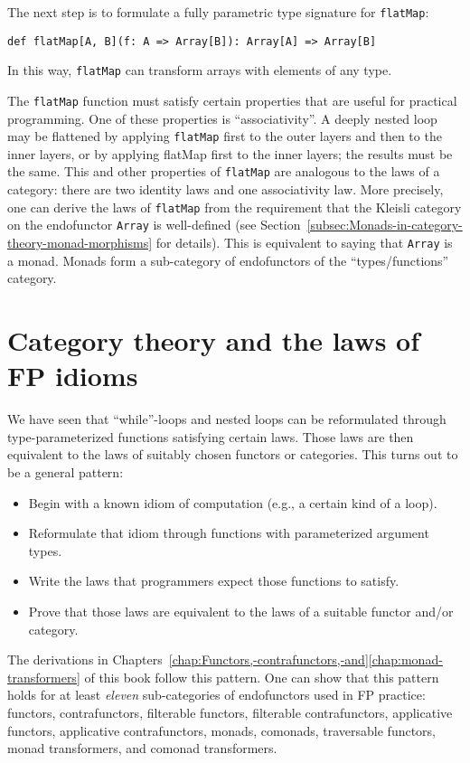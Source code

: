 The next step is to formulate a fully parametric type signature for
\lstinline!flatMap!:
\begin{lstlisting}
def flatMap[A, B](f: A => Array[B]): Array[A] => Array[B]
\end{lstlisting}
In this way, \lstinline!flatMap! can transform arrays with elements
of any type.

The \lstinline!flatMap! function must satisfy certain properties
that are useful for practical programming. One of these properties
is \textsf{``}associativity\textsf{''}. A deeply nested loop may be flattened by applying
\lstinline!flatMap! first to the outer layers and then to the inner
layers, or by applying flatMap first to the inner layers; the results
must be the same. This and other properties of \lstinline!flatMap!
are analogous to the laws of a category: there are two identity laws
and one associativity law. More precisely, one can derive the laws
of \lstinline!flatMap! from the requirement that the Kleisli category
on the endofunctor \lstinline!Array! is well-defined (see Section~\ref{subsec:Monads-in-category-theory-monad-morphisms}
for details). This is equivalent to saying that \lstinline!Array!
is a monad. Monads form a sub-category of endofunctors of the \textsf{``}types/functions\textsf{''}
category.

\section{Category theory and the laws of FP idioms}

We have seen that \textsf{``}while\textsf{''}-loops and nested loops can be reformulated
through type-parameterized functions satisfying certain laws. Those
laws are then equivalent to the laws of suitably chosen functors or
categories. This turns out to be a general pattern:
\begin{itemize}
\item Begin with a known idiom of computation (e.g., a certain kind of a
loop).
\item Reformulate that idiom through functions with parameterized argument
types.
\item Write the laws that programmers expect those functions to satisfy.
\item Prove that those laws are equivalent to the laws of a suitable functor
and/or category.
\end{itemize}
The derivations in Chapters~\ref{chap:Functors,-contrafunctors,-and}\textendash \ref{chap:monad-transformers}
of this book follow this pattern. One can show that this pattern holds
for at least \emph{eleven} sub-categories of endofunctors used in
FP practice: functors, contrafunctors, filterable functors, filterable
contrafunctors, applicative functors, applicative contrafunctors,
monads, comonads, traversable functors, monad transformers, and comonad
transformers. 

